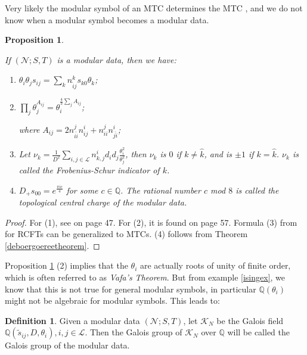 \documentclass[12pt,psamsfonts]{amsart}
\newcommand{\Q}{\mathbb Q}
\newcommand{\mL}{\mathcal{L}}
\newcommand{\mN}{\mathcal{N}}
\newcommand{\mK}{\mathcal{K}}
\numberwithin{equation}{section}
\newtheorem{prop}[theorem]{Proposition}
\theoremstyle{definition}
\newtheorem{definition}[theorem]{Definition}
\begin{document}
Very likely the modular symbol of an MTC determines the MTC , and we do not know
when a modular symbol becomes a modular data.

\begin{prop}\label{modularprop}

If $(\mN;S,T)$ is a modular data, then we have:

\begin{enumerate}

\item $\theta_i\theta_j s_{ij}=\sum_k n_{\hat{i}j}^k
s_{k0}\theta_k$;

\item $\prod_j
\theta_j^{A_{ij}}=\theta_i^{\frac{4}{3}\sum_jA_{ij}}$;

where $A_{ij}=2n_{i\hat{i}}^jn_{ij}^i+n_{ii}^jn_{j\hat{i}}^i$;

\item Let $\nu_k=\frac{1}{D^2}\sum_{i,j\in \mL}n_{k,j}^i d_id_j\frac{\theta_i^2}{\theta_j^2}$,
then $\nu_k$ is $0$ if $k\neq \hat{k}$, and is $\pm 1$ if $k=\hat{k}$.  $\nu_k$ is called
the Frobenius-Schur indicator of $k$.

\item $D_{+}s_{00}=e^{\frac{\pi i c}{4}}$ for some $c\in \Q$.  The
rational number $c$ mod $8$ is called the topological central
charge of the modular data.

\end{enumerate}

\end{prop}

\begin{proof}
For (1), see \cite[Eq. (3.1.2)]{BK} on page 47.  For (2), it is
\cite[Theorem 3.1.19]{BK} found on page 57.  Formula (3) from
\cite{Bantay1} for RCFTs can be  generalized to MTCs. (4)
follows from Theorem \ref{deboergoereetheorem}.
\end{proof}

Proposition \ref{modularprop} (2) implies that the $\theta_i$ are
actually roots of unity of finite order, which is often referred
to as \emph{Vafa's Theorem}. But from example \ref{isingex}, we
know that this is not true for general modular symbols, in
particular $\Q(\theta_i)$ might not be algebraic for modular
symbols. This leads to:
\begin{definition}

Given a modular data $(\mN; S,T)$, let $\mK_N$ be the Galois
field $\Q(\tilde{s}_{ij},D,\theta_i),i,j\in \mL$.  Then the Galois
group of $\mK_N$ over $\Q$ will be called the Galois group of the
modular data.

\end{definition}
\end{document}
